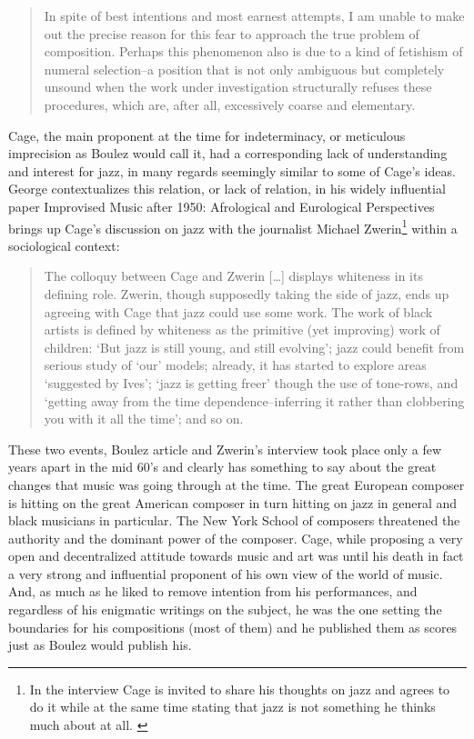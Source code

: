 \documentclass[a4paper]{article}
\begin{document}
\begin{quote} 
In spite of best intentions and most earnest attempts, I am unable to make out the precise reason for this fear to approach the true problem of composition. Perhaps this phenomenon also is due to a kind of fetishism of numeral selection--a position that is not only ambiguous but completely unsound when the work under investigation structurally refuses these procedures, which are, after all, excessively coarse and elementary.
\citep[p. 44]{boulez64}
\end{quote}

Cage, the main proponent at the time for indeterminacy, or meticulous imprecision as Boulez would call it, had a corresponding lack of understanding and interest for jazz, in many regards seemingly similar to some of Cage's ideas. George \citet{lewis-1} contextualizes this relation, or lack of relation, in his widely influential paper Improvised Music after 1950: Afrological and Eurological Perspectives brings up Cage's discussion on jazz with the journalist Michael Zwerin\footnote{In the interview Cage is invited to share his thoughts on jazz and agrees to do it while at the same time stating that jazz is not something he thinks much about at all. \citep[In]{lewis-1}} within a sociological context:

\begin{quote} 
The colloquy between Cage and Zwerin [\ldots] displays whiteness in its defining   role. Zwerin, though supposedly taking the side of jazz, ends up agreeing with Cage that jazz could   use some work. The work of black artists is defined by whiteness as the primitive (yet improving)   work of children: `But jazz is still young, and still evolving'; jazz could benefit from serious   study of `our' models; already, it has started to explore areas `suggested by Ives'; `jazz is   getting freer' though the use of tone-rows, and `getting away from the time dependence--inferring   it rather than clobbering you with it all the time'; and so on. \citep[p. 104]{lewis-1} 
\end{quote}

These two events, Boulez article and Zwerin's interview took place only a few years apart in the mid 60's and clearly has something to say about the great changes that music was going through at the time. The great European composer is hitting on the great American composer in turn hitting on jazz in general and black musicians in particular. The New York School of composers threatened the authority and the dominant power of the composer. Cage, while proposing a very open and decentralized attitude towards music and art was until his death in fact a very strong and influential proponent of his own view of the world of music. And, as much as he liked to remove intention from his performances, and regardless of his enigmatic writings on the subject, he was the one setting the boundaries for his compositions (most of them) and he published them as scores just as Boulez would publish his. 
\end{document}
